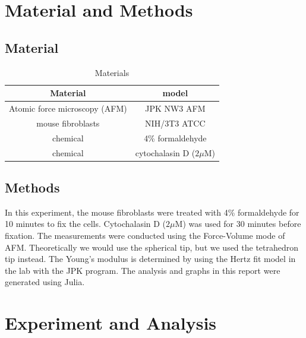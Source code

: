 \documentclass[a4paper,english,12pt,bibliography=totoc]{scrreprt}
\begin{document}
\chapter{Material and Methods}
\label{cha:exp}

\section{Material}
\label{sec:material}

\begin{table}[h]
\centering
\begin{tabular}{|c|c|}
  \hline
  Material & model \\
  \hline
  Atomic force microscopy (AFM) & JPK NW3 AFM \\
    \hline
  mouse fibroblasts & NIH/3T3 ATCC \\
    \hline
  chemical & 4\% formaldehyde\\
    \hline
  chemical &  cytochalasin D (\(2\mu \text{M}\))\\
  \hline
\end{tabular}
\caption{Materials}
\label{tab:material}
\end{table}

\section{Methods}
\label{sec:methods}
In this experiment, the mouse fibroblasts were treated with 4\% formaldehyde for 10 minutes to fix the cells. Cytochalasin D (\(2\mu \text{M}\)) was used for 30 minutes before fixation. The measurements were conducted using the Force-Volume mode of AFM. Theoretically we would use the spherical tip, but we used the tetrahedron tip instead.
The Young's modulus is determined by using the Hertz fit model in the lab with the JPK program. The analysis and graphs in this report were generated using Julia.

\chapter{Experiment and Analysis}
\label{cha:experimenandanalysis}  
\end{document}

